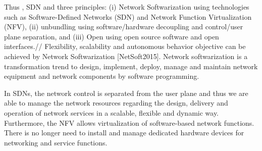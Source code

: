 \documentclass[a4paper]{article}
\begin{document}
Thus ,%
%
SDN and   three principles: (i) Network Softwarization using technologies such as Software-Defined Networks (SDN) and Network Function Virtualization (NFV), (ii) unbundling using software/hardware decoupling and control/user plane separation, and (iii) Open using open source software and open interfaces.//
Flexibility, scalability and autonomous behavior objective can be achieved by Network Softwarization [NetSoft2015]. Network softwarization is a transformation trend to design, implement, deploy, manage and maintain network equipment and network components by software programming. %

In SDNs, the network control is separated from the user plane and thus we are able to manage the network resources regarding the design, delivery and operation of network services in a scalable, flexible and dynamic way. Furthermore, the NFV allows virtualization of software-based network functions. There is no longer need to install and manage dedicated hardware devices for networking and service functions.
\end{document}
